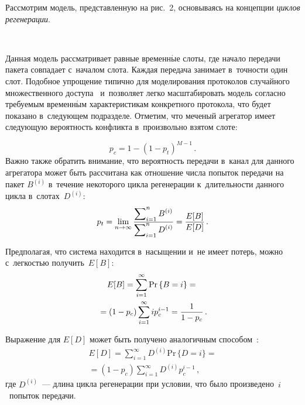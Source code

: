 \begin{multicols}{2}
    Рассмотрим модель, представленную на рис.~2, основываясь на 
концепции \textit{циклов регенерации}. 
    
\begin{figure*} %
\vspace*{1pt}
 \begin{center}  
\mbox{%
 \epsfxsize=136.118mm
 }
\end{center} 
\vspace*{-9pt}
     \end{figure*}
     
    Данная модель рассматривает равные временн$\acute{\mbox{ы}}$е слоты, где начало 
передачи пакета совпадает с~началом слота. Каждая передача занимает 
в~точности один слот. Подобное упрощение типично для моделирования 
протоколов случайного множественного доступа~\cite{9-om} 
и~позволяет легко масштабировать модель согласно требуемым 
временн$\acute{\mbox{ы}}$м характеристикам конкретного протокола, что будет показано 
в~следующем подразделе. Отметим, что меченый агрегатор имеет 
сле\-ду\-ющую вероятность конфликта в~произвольно взятом слоте:

\pagebreak

\noindent
    \begin{equation}
    p_c=1-(1-p_t)^{M-1}\,.
    \label{e1-om}
    \end{equation}
    Важно также обратить внимание, что вероятность передачи в~канал 
для данного агрегатора может быть рассчитана как отношение числа 
попыток передачи на пакет $B^{(i)}$ в~течение некоторого цикла 
регенерации к~длительности данного цикла в~слотах~$D^{(i)}$:
    \begin{equation}
    p_t=\lim\limits_{n\to\infty} \displaystyle\frac{\displaystyle \sum\nolimits_{i=1}^n 
B^{(i)}\mathstrut}{\displaystyle \sum\nolimits_{i=1}^n D^{(i)}\mathstrut}=\displaystyle\frac{\displaystyle E[B]\mathstrut}{\displaystyle E[D]\mathstrut}\,.
    \label{e2-om}
    \end{equation}
    
    Предполагая, что система находится в~насыщении и~не имеет потерь, 
можно с~легкостью получить~$E[B]$:
    \begin{multline}
    E[B]= \sum\limits_{i=1}^\infty \mathrm{Pr}\,\{B=i\} ={}\\
    {}=\left(1-p_c\right) 
\sum\limits_{i=1}^\infty ip_c^{i-1} =\displaystyle\frac{\displaystyle 1\mathstrut}{\displaystyle 1-p_c\mathstrut}\,.
    \label{e3-om}
    \end{multline}
    
    Выражение для $E[D]$ может быть получено аналогичным 
способом~\cite{10-om}:
    \begin{multline}
    E[D]= \sum\limits_{i=1}^\infty  D^{(i)} \mathrm{Pr}\,\{D=i\}={}\\
    {}=\left(1-p_c\right) 
\sum\limits_{i=1}^\infty D^{(i)} p_c^{i-1}\,,
    \label{e4-om}
    \end{multline}
где $D^{(i)}$~--- длина цикла регенерации при условии, что было 
произведено~$i$~попыток передачи.


\end{multicols}
